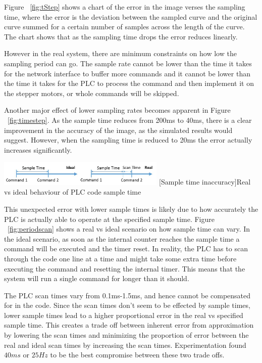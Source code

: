 Figure ~\ref{fig:tStep} shows a chart of the error in the image verses the sampling time, where the error is the deviation between the sampled curve and the original curve summed for a certain number of samples across the length of the curve. The chart shows that as the sampling time drops  the error reduces linearly.

However in the real system, there are minimum constraints on how low the sampling period can go. The sample rate cannot be lower than the time it takes for the network interface to buffer more commands and it cannot be lower than the time it takes for the PLC to process the command and then implement it on the stepper motors, or whole commands will be skipped. 

Another major effect of lower sampling rates becomes apparent in Figure ~\ref{fig:timestep}. As the sample time reduces from 200ms to 40ms, there is a clear improvement in the accuracy of the image, as the simulated results would suggest. However, when the sampling time is reduced to 20ms the error actually increases significantly. 

\begin{center}
\centering
\includegraphics[width=0.6\textwidth]{figures/performance/images/periodscan.jpg}
[Sample time inaccuracy]{Real vs ideal behaviour of PLC code sample time}
\label{fig:periodscan}
\end{center}

This unexpected error with lower sample times is likely due to how accurately the PLC is actually able to operate at the specified sample time. Figure ~\ref{fig:periodscan} shows a real vs ideal scenario on how sample time can vary. In the ideal scenario, as soon as the internal counter reaches the sample time a command will be executed and the timer reset. In reality, the PLC has to scan through the code one line at a time and might take some extra time before executing the command and resetting the internal timer. This means that the system will run a single command for longer than it should. 

The PLC scan times vary from 0.1ms-1.5ms, and hence cannot be compensated for in the code. Since the scan times don't seem to be effected by sample times, lower sample times lead to a higher proportional error in the real vs specified sample time. This creates a trade off between inherent error from approximation by lowering the scan times and minimizing the proportion of error between the real and ideal scan times by increasing the scan times. Experimentation found $40ms$ or $25Hz$ to be the best compromise between these two trade offs. 



